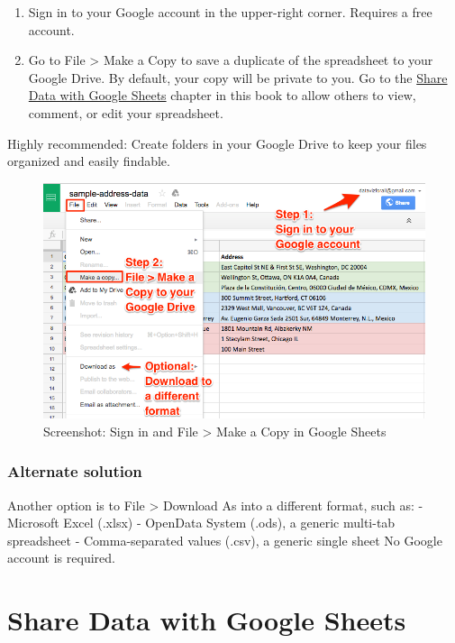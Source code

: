 \documentclass[
  english,
]{book}
\begin{document}
\begin{enumerate}
\def\labelenumi{\arabic{enumi})}
\item
  Sign in to your Google account in the upper-right corner. Requires a free account.
\item
  Go to File \textgreater{} Make a Copy to save a duplicate of the spreadsheet to your Google Drive. By default, your copy will be private to you. Go to the \href{spreadsheet.html\#share}{Share Data with Google Sheets} chapter in this book to allow others to view, comment, or edit your spreadsheet.
\end{enumerate}

Highly recommended: Create folders in your Google Drive to keep your files organized and easily findable.

\begin{figure}
\centering
\includegraphics{images/02-spreadsheet/google-sheets-copy2.png}
\caption{Screenshot: Sign in and File \textgreater{} Make a Copy in Google Sheets}
\end{figure}

\hypertarget{alternate-solution}{%
\subsubsection*{Alternate solution}\label{alternate-solution}}

Another option is to File \textgreater{} Download As into a different format, such as:
- Microsoft Excel (.xlsx)
- OpenData System (.ods), a generic multi-tab spreadsheet
- Comma-separated values (.csv), a generic single sheet
No Google account is required.

\hypertarget{share}{%
\section{Share Data with Google Sheets}\label{share}}
\end{document}
